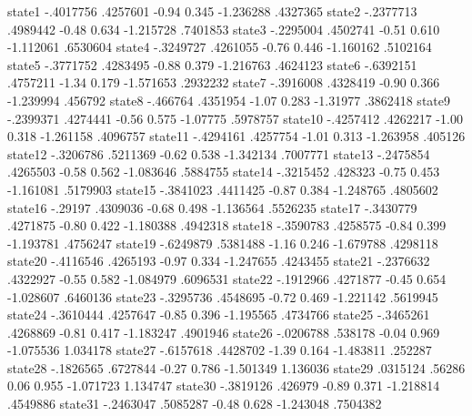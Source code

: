       state1 {\VBAR}  -.4017756   .4257601    -0.94   0.345    -1.236288    .4327365
      state2 {\VBAR}  -.2377713   .4989442    -0.48   0.634    -1.215728    .7401853
      state3 {\VBAR}  -.2295004   .4502741    -0.51   0.610    -1.112061    .6530604
      state4 {\VBAR}  -.3249727   .4261055    -0.76   0.446    -1.160162    .5102164
      state5 {\VBAR}  -.3771752   .4283495    -0.88   0.379    -1.216763    .4624123
      state6 {\VBAR}  -.6392151   .4757211    -1.34   0.179    -1.571653    .2932232
      state7 {\VBAR}  -.3916008   .4328419    -0.90   0.366    -1.239994     .456792
      state8 {\VBAR}   -.466764   .4351954    -1.07   0.283     -1.31977    .3862418
      state9 {\VBAR}  -.2399371   .4274441    -0.56   0.575     -1.07775    .5978757
     state10 {\VBAR}  -.4257412   .4262217    -1.00   0.318    -1.261158    .4096757
     state11 {\VBAR}  -.4294161   .4257754    -1.01   0.313    -1.263958     .405126
     state12 {\VBAR}  -.3206786   .5211369    -0.62   0.538    -1.342134    .7007771
     state13 {\VBAR}  -.2475854   .4265503    -0.58   0.562    -1.083646    .5884755
     state14 {\VBAR}  -.3215452    .428323    -0.75   0.453    -1.161081    .5179903
     state15 {\VBAR}  -.3841023   .4411425    -0.87   0.384    -1.248765    .4805602
     state16 {\VBAR}    -.29197   .4309036    -0.68   0.498    -1.136564    .5526235
     state17 {\VBAR}  -.3430779   .4271875    -0.80   0.422    -1.180388    .4942318
     state18 {\VBAR}  -.3590783   .4258575    -0.84   0.399    -1.193781    .4756247
     state19 {\VBAR}  -.6249879   .5381488    -1.16   0.246    -1.679788    .4298118
     state20 {\VBAR}  -.4116546   .4265193    -0.97   0.334    -1.247655    .4243455
     state21 {\VBAR}  -.2376632   .4322927    -0.55   0.582    -1.084979    .6096531
     state22 {\VBAR}  -.1912966   .4271877    -0.45   0.654    -1.028607    .6460136
     state23 {\VBAR}  -.3295736   .4548695    -0.72   0.469    -1.221142    .5619945
     state24 {\VBAR}  -.3610444   .4257647    -0.85   0.396    -1.195565    .4734766
     state25 {\VBAR}  -.3465261   .4268869    -0.81   0.417    -1.183247    .4901946
     state26 {\VBAR}  -.0206788    .538178    -0.04   0.969    -1.075536    1.034178
     state27 {\VBAR}  -.6157618   .4428702    -1.39   0.164    -1.483811     .252287
     state28 {\VBAR}  -.1826565   .6727844    -0.27   0.786    -1.501349    1.136036
     state29 {\VBAR}   .0315124     .56286     0.06   0.955    -1.071723    1.134747
     state30 {\VBAR}  -.3819126    .426979    -0.89   0.371    -1.218814    .4549886
     state31 {\VBAR}  -.2463047   .5085287    -0.48   0.628    -1.243048    .7504382
